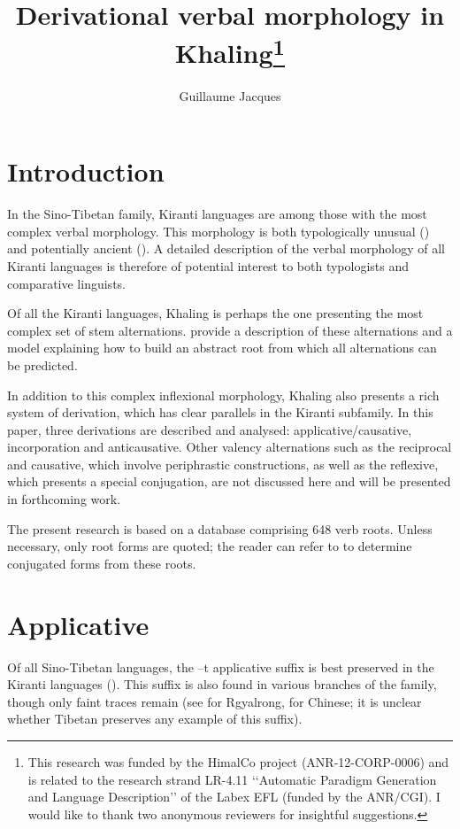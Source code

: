 \documentclass[oldfontcommands,oneside,a4paper,11pt]{article}
\newcommand{\ipa}[1]{{\phon #1}} %
\begin{document}
 


\title{Derivational verbal morphology in Khaling\footnote{This research was funded by the HimalCo project (ANR-12-CORP-0006) and is related to the research strand LR-4.11 ‘‘Automatic Paradigm Generation and Language Description’’ of the Labex EFL (funded by the ANR/CGI). I would like to thank two anonymous reviewers for insightful suggestions.  } }
\author{Guillaume Jacques }
\maketitle


\section{Introduction}
In the Sino-Tibetan family, Kiranti languages are among those with the most complex verbal morphology. This morphology is both typologically unusual (\citealt{bickel07chintang}) and potentially ancient (\citealt{jacques12agreement, delancey14second}). A detailed description of the verbal morphology of all Kiranti languages is therefore of potential interest to both typologists and comparative linguists.

Of all the Kiranti languages, Khaling is perhaps the one presenting the most complex set of stem alternations.  \citet{jacques12khaling} provide a description of these alternations and a model explaining how to build an abstract root  from which all alternations can be predicted.

In addition to this complex inflexional morphology, Khaling also presents a rich system of derivation, which has clear parallels in the Kiranti subfamily. In this paper, three derivations are described and analysed: applicative/causative, incorporation and anticausative. Other valency alternations such as the reciprocal and causative, which involve periphrastic constructions, as well as the reflexive, which presents a special conjugation, are not discussed here and will be presented in forthcoming work.

 The present research is based on a database comprising 648 verb roots. Unless necessary, only root forms are quoted; the reader can refer to \citet{jacques12khaling} to determine conjugated forms from these roots.

\section{Applicative}
Of all Sino-Tibetan languages, the \ipa{--t} applicative suffix is best preserved in the Kiranti languages (\citealt{michailovsky85dental}). This suffix is also found in various branches of the family, though only faint traces remain (see \citealt[410]{jacques04these} for Rgyalrong, \citealt{sagart04directions} for Chinese; it is unclear whether Tibetan preserves any example of this suffix).
\end{document}
